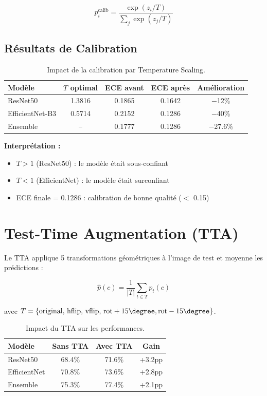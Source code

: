 \documentclass[12pt,a4paper,oneside]{report}
\begin{document}
\begin{equation}
p_i^{\text{calib}} = \frac{\exp(z_i / T)}{\sum_j \exp(z_j / T)}
\label{eq:temperature}
\end{equation}

\subsection{Résultats de Calibration}

\begin{table}[H]
\centering
\caption{Impact de la calibration par Temperature Scaling.}
\label{tab:calibration}
\begin{tabular}{|l|c|c|c|c|}
\hline
\textbf{Modèle} & \textbf{$T$ optimal} & \textbf{ECE avant} & \textbf{ECE après} & \textbf{Amélioration} \\
\hline
ResNet50 & 1.3816 & 0.1865 & 0.1642 & $-$12\% \\
EfficientNet-B3 & 0.5714 & 0.2152 & 0.1286 & $-$40\% \\
Ensemble & -- & 0.1777 & 0.1286 & $-$27.6\% \\
\hline
\end{tabular}
\end{table}

\textbf{Interprétation :}
\begin{itemize}
    \item $T > 1$ (ResNet50) : le modèle était sous-confiant
    \item $T < 1$ (EfficientNet) : le modèle était surconfiant
    \item ECE finale = 0.1286 : calibration de bonne qualité ($<$ 0.15)
\end{itemize}

\section{Test-Time Augmentation (TTA)}

Le TTA applique 5 transformations géométriques à l'image de test et
moyenne les prédictions :

\begin{equation}
\hat{p}(c) = \frac{1}{|T|} \sum_{t \in T} p_t(c)
\label{eq:tta}
\end{equation}

avec $T = \{\text{original, hflip, vflip, rot}+15\degree, \text{rot}-15\degree\}$.

\begin{table}[H]
\centering
\caption{Impact du TTA sur les performances.}
\label{tab:tta}
\begin{tabular}{|l|c|c|c|}
\hline
\textbf{Modèle} & \textbf{Sans TTA} & \textbf{Avec TTA} & \textbf{Gain} \\
\hline
ResNet50 & 68.4\% & 71.6\% & +3.2pp \\
EfficientNet & 70.8\% & 73.6\% & +2.8pp \\
Ensemble & 75.3\% & 77.4\% & +2.1pp \\
\hline
\end{tabular}
\end{table}
\end{document}
